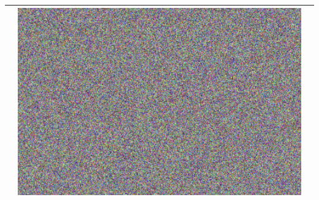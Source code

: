 \documentclass[fleqn, journal, onecolumn]{IEEEtran}             %
\theoremstyle{break}                                            %
\begin{document}
\begin{tabular}{|r || p{5cm} | p{5cm} | }
\begin{minipage}{.2\textwidth}
        \end{minipage}  & 
        \begin{minipage}{.2\textwidth}
          \includegraphics[width=\linewidth]{2AES4}
        \end{minipage}    
        \\\hline
   \end{tabular}
\end{document}
